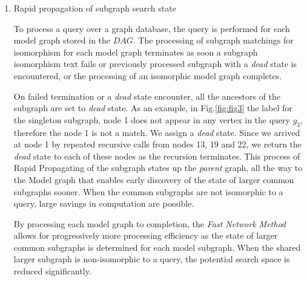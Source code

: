 \begin{enumerate}
\begin{enumerate}
\item{Rapid propagation of subgraph search state}

To process a query over a graph database, the query is performed for each model graph stored in the $DAG$. 
The processing of subgraph matchings for isomorphism for each model graph terminates as soon a subgraph isomorphism text fails or previously processed subgraph with a \textit{dead} state is encountered, or the processing of an isomorphic model graph completes. 


On failed termination or a \textit{dead} state encounter, all the ancestors of the subgraph are set to \textit{dead} state. 
As an example, in Fig.\ref{fig:fig3} the label for the singleton subgraph, node 1 does not appear in any vertex in the query $g_3$, therefore the node 1 is not a match. 
We assign a \textit{dead} state. Since we arrived at node 1 by repeated recursive calls from nodes 13, 19 and 22, we return the \textit{dead} state to each of these nodes as the recursion terminates. 
This process of Rapid Propagating of the subgraph states up the \textit{parent} graph, all the way to the Model graph that enables early discovery of the state of larger common subgraphs sooner. 
When the common subgraphs are not isomorphic to a query, large savings in computation are possible.

By processing each model graph to completion, the \textit{Fast Network Method} allows for progressively more processing efficiency as the state of larger common subgraphs is determined for each model subgraph. 
When the shared larger subgraph is non-isomorphic to a query, the potential search space is reduced significantly.





\end{enumerate}
\end{enumerate}
